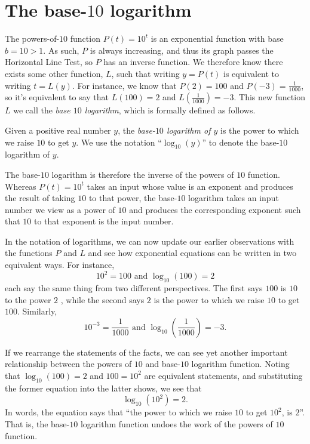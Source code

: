 \documentclass[nooutcomes]{ximera}
\begin{document}
\section{The base-\(10\) logarithm}

The powers-of-\(10\) function \(P(t) = 10^t\) is an exponential function with base \(b = 10 > 1\).  As such, \(P\) is always increasing, and thus its graph passes the Horizontal Line Test, so \(P\) has an inverse function.  We therefore know there exists some other function, \(L\), such that writing \(y = P(t)\) is equivalent to writing \(t = L(y)\).  For instance, we know that \(P(2)=100\) and \(P(-3)=\frac{1}{1000}\), so it's equivalent to say that \(L(100) = 2\) and \(L(\frac{1}{1000}) = -3\).  This new function \(L\) we call the \emph{base \(10\) logarithm}, which is formally defined as follows.%

Given a positive real number \(y\), the \emph{base-\(10\) logarithm of \(y\)} is the power to which we raise \(10\) to get \(y\).  We use the notation ``\(\log_{10}(y)\)'' to denote the base-\(10\) logarithm of \(y\).%

The base-\(10\) logarithm is therefore the inverse of the powers of \(10\) function.  Whereas \(P(t) = 10^t\) takes an input whose value is an exponent and produces the result of taking \(10\) to that power, the base-\(10\) logarithm takes an input number we view as a power of \(10\) and produces the corresponding exponent such that \(10\) to that exponent is the input number.%

In the notation of logarithms, we can now update our earlier observations with the functions \(P\) and \(L\) and see how exponential equations can be written in two equivalent ways.  For instance,%
\begin{equation}
10^2 = 100 \text{ and } \log_{10}(100) = 2\label{eq-exp-log-base-10-2}
\end{equation}
each say the same thing from two different perspectives.  The first says \(100\) is \(10\) to the power \(2\) , while the second says \(2\) is the power to which we raise \(10\) to get \(100\).  Similarly,%
\begin{equation}
10^{-3} = \frac{1}{1000} \text{ and } \log_{10} \left( \frac{1}{1000} \right) = -3\text{.}\label{eq-exp-log-base-10-minus-3}
\end{equation}

If we rearrange the statements of the facts, we can see yet another important relationship between the powers of \(10\) and base-\(10\) logarithm function.  Noting that \(\log_{10}(100) = 2\) and \(100 = 10^2\) are equivalent statements, and substituting the former equation into the latter shows, we see that%
\begin{equation}
\log_{10}(10^2) = 2\text{.}
\end{equation}
In words, the equation says that ``the power to which we raise \(10\) to get \(10^2\), is \(2\)''.  That is, the base-\(10\) logarithm function undoes the work of the powers of \(10\) function.%
\end{document}
